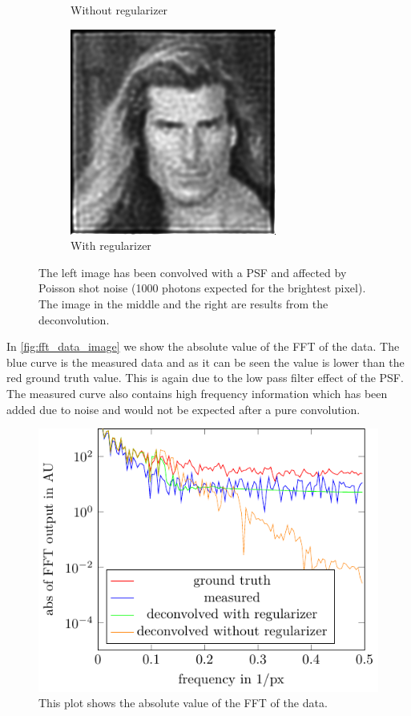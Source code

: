 \documentclass{juliacon}
\begin{document}
\begin{figure}[h]
\begin{subfigure}[b]{.166\textwidth}
                \caption{Without regularizer}
                \label{fig:fabiob}
            \end{subfigure}%
            \begin{subfigure}[b]{.166\textwidth}
                \centering
                \includegraphics[width=\textwidth]{figures/fabio_deconv_regularizer_005_iter_30.png}
                \caption{With regularizer}
                \label{fig:fabioc}
            \end{subfigure}%
            \caption{The left image has been convolved with a PSF and affected by Poisson shot noise (1000 photons expected for the brightest pixel). The image in the middle and the right are results from the deconvolution.}
            \label{fig:image}
        \end{figure}
        In \autoref{fig:fft_data_image} we show the absolute value of the FFT of the data. The blue curve is the measured data and as it can
        be seen the value is lower than the red ground truth value. This is again due to the low pass filter effect of the PSF.
        The measured curve also contains high frequency information which has been added due to noise and would not be expected 
        after a pure convolution.
        \begin{figure}[h]
            \centering
            \includegraphics[width = .4\textwidth]{figures/frequencies_img.pdf}
            \caption{This plot shows the absolute value of the FFT of the data.}
            \label{fig:fft_data_image}
        \end{figure}
\end{document}
